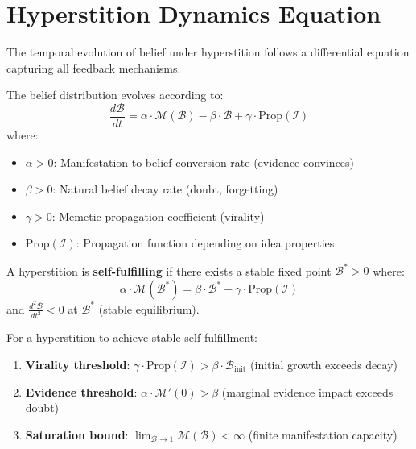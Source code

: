 \section{Hyperstition Dynamics Equation}
\label{sec:hyperstition-dynamics}

The temporal evolution of belief under hyperstition follows a differential equation capturing all feedback mechanisms.

\begin{theorem}
\label{thm:hyperstition-dynamics}
The belief distribution evolves according to:
\begin{equation}
\boxed{
\frac{d\mathcal{B}}{dt} = \alpha \cdot \mathcal{M}(\mathcal{B}) - \beta \cdot \mathcal{B} + \gamma \cdot \mathrm{Prop}(\mathcal{I})
}
\end{equation}
where:
\begin{itemize}
    \item $\alpha > 0$: Manifestation-to-belief conversion rate (evidence convinces)
    \item $\beta > 0$: Natural belief decay rate (doubt, forgetting)
    \item $\gamma > 0$: Memetic propagation coefficient (virality)
    \item $\mathrm{Prop}(\mathcal{I})$: Propagation function depending on idea properties
\end{itemize}
\end{theorem}

\begin{definition}
\label{def:self-fulfillment}
A hyperstition is \textbf{self-fulfilling} if there exists a stable fixed point $\mathcal{B}^* > 0$ where:
\begin{equation}
\boxed{
\alpha \cdot \mathcal{M}(\mathcal{B}^*) = \beta \cdot \mathcal{B}^* - \gamma \cdot \mathrm{Prop}(\mathcal{I})
}
\end{equation}
and $\frac{d^2\mathcal{B}}{dt^2} < 0$ at $\mathcal{B}^*$ (stable equilibrium).
\end{definition}

\begin{proposition}
\label{prop:stability-conditions}
For a hyperstition to achieve stable self-fulfillment:
\begin{enumerate}
    \item \textbf{Virality threshold}: $\gamma \cdot \mathrm{Prop}(\mathcal{I}) > \beta \cdot \mathcal{B}_{\text{init}}$ (initial growth exceeds decay)
    \item \textbf{Evidence threshold}: $\alpha \cdot \mathcal{M}'(0) > \beta$ (marginal evidence impact exceeds doubt)
    \item \textbf{Saturation bound}: $\lim_{\mathcal{B} \to 1} \mathcal{M}(\mathcal{B}) < \infty$ (finite manifestation capacity)
\end{enumerate}
\end{proposition}

